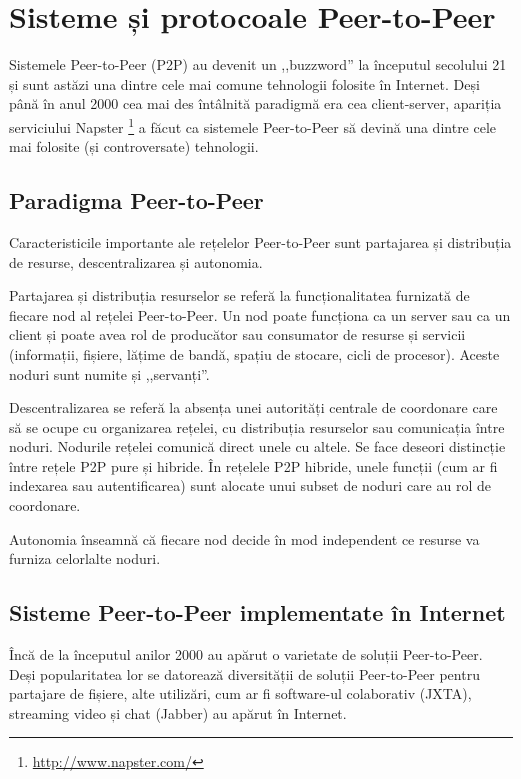 
\chapter{Sisteme și protocoale Peer-to-Peer}
\label{chapter:p2p-systems}

Sistemele Peer-to-Peer (P2P) au devenit un ,,buzzword'' la începutul
secolului 21 și sunt astăzi una dintre cele mai comune tehnologii folosite
în Internet. Deși până în anul 2000 cea mai des întâlnită paradigmă
era cea client-server, apariția serviciului Napster
\footnote{\url{http://www.napster.com/}} a făcut ca sistemele Peer-to-Peer
să devină una dintre cele mai folosite (și controversate) tehnologii.

\section{Paradigma Peer-to-Peer}
\label{sec:p2p-systems:paragigm}

Caracteristicile importante ale rețelelor Peer-to-Peer sunt partajarea și
distribuția de resurse, descentralizarea și autonomia.

Partajarea și distribuția resurselor se referă la funcționalitatea
furnizată de fiecare nod al rețelei Peer-to-Peer. Un nod poate funcționa
ca un server sau ca un client și poate avea rol de producător sau
consumator de resurse și servicii (informații, fișiere, lățime de bandă,
spațiu de stocare, cicli de procesor). Aceste noduri sunt numite și
,,servanți''.

Descentralizarea se referă la absența unei autorități centrale de coordonare
care să se ocupe cu organizarea rețelei, cu distribuția resurselor sau
comunicația între noduri. Nodurile rețelei comunică direct unele cu altele.
Se face deseori distincție între rețele P2P pure și hibride. În rețelele P2P
hibride, unele funcții (cum ar fi indexarea sau autentificarea) sunt alocate
unui subset de noduri care au rol de coordonare.

Autonomia înseamnă că fiecare nod decide în mod independent ce resurse
va furniza celorlalte noduri.

\section{Sisteme Peer-to-Peer implementate în Internet}
\label{sec:p2p-systems:p2p-internet}

Încă de la începutul anilor 2000 au apărut o varietate de soluții Peer-to-Peer.
Deși popularitatea lor se datorează diversității de soluții Peer-to-Peer pentru
partajare de fișiere, alte utilizări, cum ar fi software-ul colaborativ
(JXTA), streaming video și chat (Jabber) au apărut în Internet.

